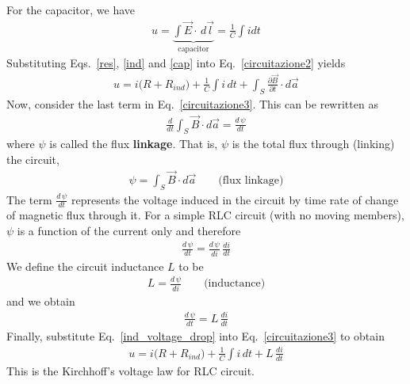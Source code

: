 \documentclass[11pt,a4paper,oneside]{book}
\numberwithin{equation}{section}
\theoremstyle{it}
\theoremstyle{definition}
\begin{document}
For the capacitor, we have
\begin{equation}\label{cap}
	\begin{aligned}
		u = \underbrace{\int\vec{E}\cdot\,d\vec{l}}_{\text{capacitor}} =\frac{1}{C}\int idt
	\end{aligned}
\end{equation} 
Substituting Eqs.~\eqref{res}, \ref{ind} and \ref{cap} into Eq.~\eqref{circuitazione2} yields
\begin{equation}\label{circuitazione3}
	\begin{aligned}
		u = i\big(R+R_{ind}\big)+\frac{1}{C}\int i\,dt+\int_{S}\frac{\partial \vec{B}}{\partial t}\cdot d\vec{a}
	\end{aligned}
\end{equation} 
Now, consider the last term in Eq.~\eqref{circuitazione3}. This can be rewritten as
\begin{equation}\label{flux}
	\begin{aligned}
		\frac{d}{dt} \int_{S}\vec{B}\cdot d\vec{a} = \frac{d\,\psi}{dt}
	\end{aligned}
\end{equation} 
where $\psi$ is called the flux \textbf{linkage}. That is, $\psi$ is the total flux through (linking) the circuit,
\begin{equation}\label{flux_linkage}
	\begin{aligned}
		\psi = \int_{S}\vec{B}\cdot d\vec{a} \qquad\text{(flux linkage)}
	\end{aligned}
\end{equation} 
The term $\frac{d\,\psi}{dt}$ represents the voltage induced in the circuit by time rate of change of magnetic flux through it. For a simple RLC circuit (with no moving members), $\psi$ is a function of the current only and therefore
\begin{equation}\label{}
	\begin{aligned}
		\frac{d\,\psi}{dt} = \frac{d\,\psi}{di}\,\frac{di}{dt}
	\end{aligned}
\end{equation} 
We define the circuit inductance $L$ to be 
\begin{equation}\label{inductance}
	\begin{aligned}
		L = \frac{d\,\psi}{di}\qquad\text{(inductance)}
	\end{aligned}
\end{equation} 
and we obtain 
\begin{equation}\label{ind_voltage_drop}
	\begin{aligned}
		\frac{d\,\psi}{dt} = L\,\frac{di}{dt}
	\end{aligned}
\end{equation} 
Finally, substitute Eq.~\eqref{ind_voltage_drop} into Eq.~\eqref{circuitazione3} to obtain
\begin{equation}\label{circuitazione4}
	\begin{aligned}
		u = i\big(R+R_{ind}\big)+\frac{1}{C}\int i\,dt+L\,\frac{di}{dt}
	\end{aligned}
\end{equation} 
This is the Kirchhoff's voltage law for RLC circuit.
\end{document}
